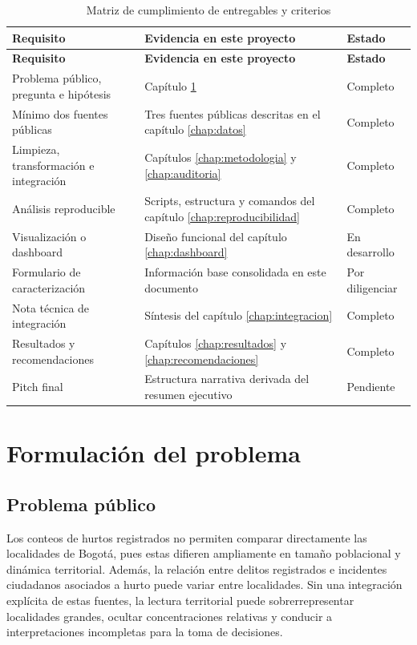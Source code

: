 \documentclass[11pt,letterpaper,oneside]{report}
\begin{document}
\begin{longtable}{L{0.29\textwidth}L{0.43\textwidth}C{0.15\textwidth}}
\caption{Matriz de cumplimiento de entregables y criterios}\label{tab:compliance}\\
\toprule
\textbf{Requisito} & \textbf{Evidencia en este proyecto} & \textbf{Estado} \\
\midrule
\endfirsthead
\toprule
\textbf{Requisito} & \textbf{Evidencia en este proyecto} & \textbf{Estado} \\
\midrule
\endhead
Problema público, pregunta e hipótesis & Capítulo \ref{chap:formulacion} & Completo \\
Mínimo dos fuentes públicas & Tres fuentes públicas descritas en el capítulo \ref{chap:datos} & Completo \\
Limpieza, transformación e integración & Capítulos \ref{chap:metodologia} y \ref{chap:auditoria} & Completo \\
Análisis reproducible & Scripts, estructura y comandos del capítulo \ref{chap:reproducibilidad} & Completo \\
Visualización o dashboard & Diseño funcional del capítulo \ref{chap:dashboard} & En desarrollo \\
Formulario de caracterización & Información base consolidada en este documento & Por diligenciar \\
Nota técnica de integración & Síntesis del capítulo \ref{chap:integracion} & Completo \\
Resultados y recomendaciones & Capítulos \ref{chap:resultados} y \ref{chap:recomendaciones} & Completo \\
Pitch final & Estructura narrativa derivada del resumen ejecutivo & Pendiente \\
\bottomrule
\end{longtable}

\chapter{Formulación del problema}\label{chap:formulacion}

\section{Problema público}

Los conteos de hurtos registrados no permiten comparar directamente las localidades de Bogotá, pues estas difieren ampliamente en tamaño poblacional y dinámica territorial. Además, la relación entre delitos registrados e incidentes ciudadanos asociados a hurto puede variar entre localidades. Sin una integración explícita de estas fuentes, la lectura territorial puede sobrerrepresentar localidades grandes, ocultar concentraciones relativas y conducir a interpretaciones incompletas para la toma de decisiones.
\end{document}
